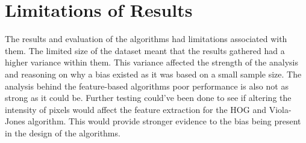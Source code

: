 \documentclass{l4proj}
\begin{document}
\section{Limitations of Results}
%
The results and evaluation of the algorithms had limitations associated with them. The limited size of the dataset meant that the results gathered had a higher variance within them. This variance affected the strength of the analysis and reasoning on why a bias existed as it was based on a small sample size. The analysis behind the feature-based algorithms poor performance is also not as strong as it could be. Further testing could've been done to see if altering the intensity of pixels would affect the feature extraction for the HOG and Viola-Jones algorithm. This would provide stronger evidence to the bias being present in the design of the algorithms. 

\end{document}
